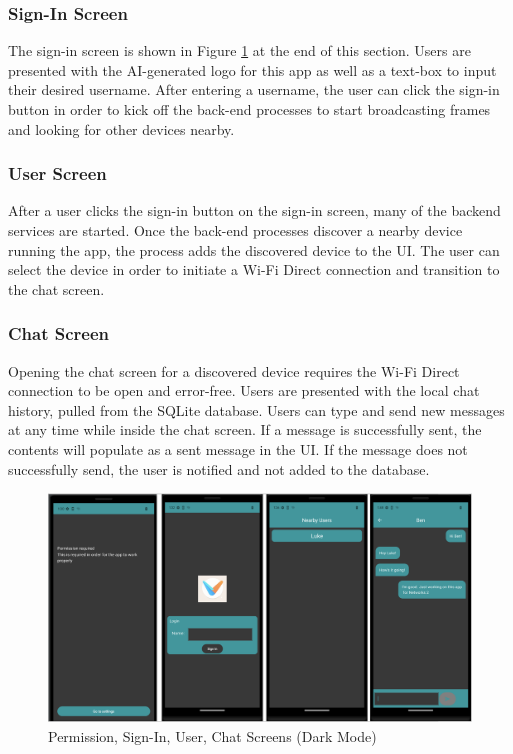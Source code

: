 \documentclass[10pt]{article}
\begin{document}
\subsubsection{Sign-In Screen}
The sign-in screen is shown in Figure \ref{frontend:screens} at the end of this section. Users are presented with the AI-generated logo for this app as well as a text-box to input their desired username. After entering a username, the user can click the sign-in button in order to kick off the back-end processes to start broadcasting frames and looking for other devices nearby.
\subsubsection{User Screen}

After a user clicks the sign-in button on the sign-in screen, many of the backend services are started. Once the back-end processes discover a nearby device running the app, the process adds the discovered device to the UI. The user can select the device in order to initiate a Wi-Fi Direct connection and transition to the chat screen.

\subsubsection{Chat Screen}
Opening the chat screen for a discovered device requires the Wi-Fi Direct connection to be open and error-free. Users are presented with the local chat history, pulled from the SQLite database. Users can type and send new messages at any time while inside the chat screen. If a message is successfully sent, the contents will populate as a sent message in the UI. If the message does not successfully send, the user is notified and not added to the database.

\begin{figure}[h]
    \centering
    \includegraphics[width=6.5in]{screens.png}
    \caption{Permission, Sign-In, User, Chat Screens (Dark Mode)}
    \label{frontend:screens}
\end{figure}
\end{document}
